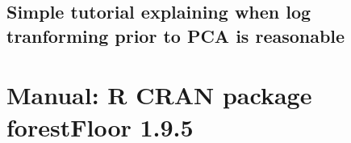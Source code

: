 \subsection{Simple tutorial explaining when log tranforming prior to PCA is reasonable}





\section{Manual: R CRAN package forestFloor 1.9.5}



